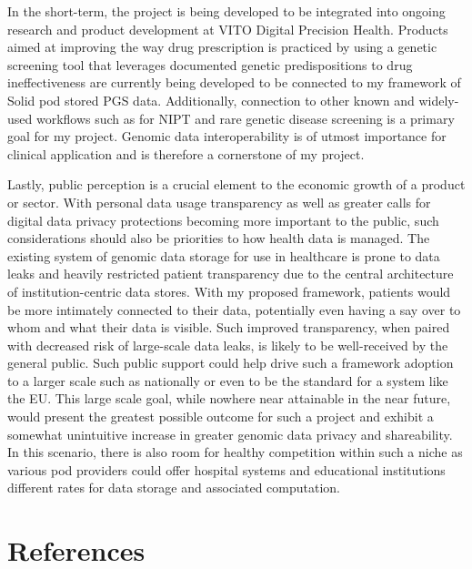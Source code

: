 \documentclass[a4paper,11pt]{article}
\begin{document}
\begin{refsection}
In the short-term, the project is being developed to be integrated into ongoing research and product development at VITO Digital Precision Health. 
Products aimed at improving the way drug prescription is practiced by using a genetic screening tool that leverages documented genetic predispositions to drug ineffectiveness are currently being developed to be connected to my framework of Solid pod stored PGS data. 
Additionally, connection to other known and widely-used workflows such as for NIPT and rare genetic disease screening is a primary goal for my project. 
Genomic data interoperability is of utmost importance for clinical application and is therefore a cornerstone of my project. 

Lastly, public perception is a crucial element to the economic growth of a product or sector. 
With personal data usage transparency as well as greater calls for digital data privacy protections becoming more important to the public, such considerations should also be priorities to how health data is managed. 
The existing system of genomic data storage for use in healthcare is prone to data leaks and heavily restricted patient transparency due to the central architecture of institution-centric data stores. 
With my proposed framework, patients would be more intimately connected to their data, potentially even having a say over to whom and what their data is visible. 
Such improved transparency, when paired with decreased risk of large-scale data leaks, is likely to be well-received by the general public. 
Such public support could help drive such a framework adoption to a larger scale such as nationally or even to be the standard for a system like the EU. 
This large scale goal, while nowhere near attainable in the near future, would present the greatest possible outcome for such a project and exhibit a somewhat unintuitive increase in greater genomic data privacy and shareability. 
In this scenario, there is also room for healthy competition within such a niche as various pod providers could offer hospital systems and educational institutions different rates for data storage and associated computation.


\section{References}
\smallskip
\printbibliography[heading=none]


\end{refsection}
\end{document}
